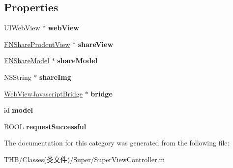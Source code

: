 \subsection*{Properties}
\begin{DoxyCompactItemize}
\item 
\mbox{\label{category_super_view_controller_07_08_a6d0735c46e779a1da2a87673e85f104f}} 
U\+I\+Web\+View $\ast$ {\bfseries web\+View}
\item 
\mbox{\label{category_super_view_controller_07_08_ae36cbf512a11c60488984496b846d859}} 
\mbox{\hyperlink{interface_f_n_share_prodcut_view}{F\+N\+Share\+Prodcut\+View}} $\ast$ {\bfseries share\+View}
\item 
\mbox{\label{category_super_view_controller_07_08_ad354913a3a6f5cba4e7a04b8dea396b4}} 
\mbox{\hyperlink{interface_f_n_share_model}{F\+N\+Share\+Model}} $\ast$ {\bfseries share\+Model}
\item 
\mbox{\label{category_super_view_controller_07_08_a3f09d576b56eec3b33c2c44a42cbf02c}} 
N\+S\+String $\ast$ {\bfseries share\+Img}
\item 
\mbox{\label{category_super_view_controller_07_08_a37c5f1955ec6a328033c9d7f41c119a1}} 
\mbox{\hyperlink{interface_web_view_javascript_bridge}{Web\+View\+Javascript\+Bridge}} $\ast$ {\bfseries bridge}
\item 
\mbox{\label{category_super_view_controller_07_08_a1390eba94e1286da1456196f8b00929d}} 
id {\bfseries model}
\item 
\mbox{\label{category_super_view_controller_07_08_a2b2af97daa55c02a0fde5897368ce5f9}} 
B\+O\+OL {\bfseries request\+Successful}
\end{DoxyCompactItemize}


The documentation for this category was generated from the following file\+:\begin{DoxyCompactItemize}
\item 
T\+H\+B/\+Classes(类文件)/\+Super/Super\+View\+Controller.\+m\end{DoxyCompactItemize}
